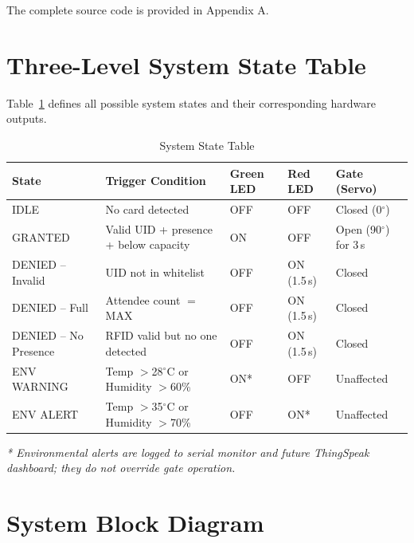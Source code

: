 \documentclass[12pt,a4paper]{report}
\begin{document}
{The complete source code is provided in Appendix A.


\section{Three-Level System State Table}

Table~\ref{tab:states} defines all possible system states and their corresponding hardware outputs.

\begin{table}[h!]
\centering
\caption{System State Table}
\label{tab:states}
\renewcommand{\arraystretch}{1.3}

\begin{tabular}{|p{3cm}|p{5cm}|p{1.5cm}|p{1.5cm}|p{2cm}|}
\hline
\textbf{State} & \textbf{Trigger Condition} & \textbf{Green LED} & \textbf{Red LED} & \textbf{Gate (Servo)} \\
\hline

IDLE & No card detected & OFF & OFF & Closed (0$^\circ$) \\
\hline

GRANTED & Valid UID + presence + below capacity & ON & OFF & Open (90$^\circ$) for 3\,s \\
\hline

DENIED -- Invalid & UID not in whitelist & OFF & ON (1.5\,s) & Closed \\
\hline

DENIED -- Full & Attendee count $=$ MAX & OFF & ON (1.5\,s) & Closed \\
\hline

DENIED -- No Presence & RFID valid but no one detected & OFF & ON (1.5\,s) & Closed \\
\hline

ENV WARNING & Temp $>$28$^\circ$C or Humidity $>$60\% & ON* & OFF & Unaffected \\
\hline

ENV ALERT & Temp $>$35$^\circ$C or Humidity $>$70\% & OFF & ON* & Unaffected \\
\hline

\end{tabular}
\end{table}

\vspace{0.3cm}
\textit{* Environmental alerts are logged to serial monitor and future ThingSpeak dashboard; they do not override gate operation.}

\section{System Block Diagram}

}
\end{document}
